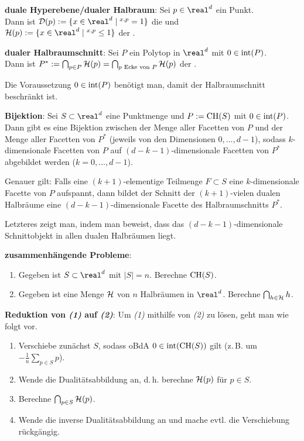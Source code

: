 \linie

\textbf{duale Hyperebene/dualer Halbraum}:
Sei $p \in \real^d$ ein Punkt.\\
Dann ist $\D(p) := \{x \in \real^d \;|\; \sp{x, p} = 1\}$ die  und\\
$\H(p) := \{x \in \real^d \;|\; \sp{x, p} \le 1\}$ der .

\textbf{dualer Halbraumschnitt}:
Sei $P$ ein Polytop in $\real^d$ mit $0 \in \operatorname{int}(P)$.\\
Dann ist $P^\ast := \bigcap_{p \in P} \mathcal{H}(p) = \bigcap_{\text{$p$ Ecke von $P$}} \mathcal{H}(p)$
der .

Die Voraussetzung $0 \in \operatorname{int}(P)$ benötigt man, damit der Halbraumschnitt beschränkt ist.

\linie

\textbf{Bijektion}:
Sei $S \subset \real^d$ eine Punktmenge und $P := \operatorname{CH}(S)$ mit $0 \in \operatorname{int}(P)$.\\
Dann gibt es eine Bijektion zwischen
der Menge aller Facetten von $P$ und
der Menge aller Facetten von $P^\ast$ (jeweils von den Dimensionen $0, \dotsc, d - 1$),
sodass $k$-dimensionale Facetten von $P$ auf $(d - k - 1)$-dimensionale Facetten von $P^\ast$
abgebildet werden ($k = 0, \dotsc, d - 1$).

Genauer gilt:
Falls eine $(k + 1)$-elementige Teilmenge $F \subset S$ eine $k$-dimensionale Facette
von $P$ aufspannt,
dann bildet der Schnitt der $(k + 1)$-vielen dualen Halbräume eine $(d - k - 1)$-dimensionale
Facette des Halbraumschnitts $P^\ast$.

Letzteres zeigt man, indem man beweist, dass das $(d - k - 1)$-dimensionale Schnittobjekt in
allen dualen Halbräumen liegt.

\linie

\textbf{zusammenhängende Probleme}:
\begin{enumerate}
    \item
    Gegeben ist $S \subset \real^d$ mit $|S| = n$.
    Berechne $\operatorname{CH}(S)$.
    
    \item
    Gegeben ist eine Menge $\mathcal{H}$ von $n$ Halbräumen in $\real^d$.
    Berechne $\bigcap_{h \in \mathcal{H}} h$.
\end{enumerate}

\textbf{Reduktion von \emph{(1)} auf \emph{(2)}}:
Um \emph{(1)} mithilfe von \emph{(2)} zu lösen, geht man wie folgt vor.
\begin{enumerate}
    \item
    Verschiebe zunächst $S$, sodass oBdA $0 \in \operatorname{int}(\operatorname{CH}(S))$ gilt
    (z.\,B. um $-\frac{1}{n} \sum_{p \in S} p$).
    
    \item
    Wende die Dualitätsabbildung an, d.\,h. berechne $\mathcal{H}(p)$ für $p \in S$.
    
    \item
    Berechne $\bigcap_{p \in S} \mathcal{H}(p)$.
    
    \item
    Wende die inverse Dualitätsabbildung an und mache evtl. die Verschiebung rückgängig.
\end{enumerate}

